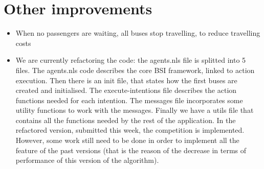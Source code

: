 \documentclass[a4paper]{article}
\begin{document}
\section{Other improvements}
\begin{itemize}
\item When no passengers are waiting, all buses stop travelling, to reduce travelling costs
\item We are currently refactoring the code: the agents.nls file is splitted into 5 files. The agents.nls code describes the core BSI framework, linked to action execution. Then there is an init file, that states how the first buses are created and initialised. The execute-intentions file describes the action functions needed for each intention. The messages file incorporates some utility functions to work with the messages. Finally we have a utils file that contains all the functions needed by the rest of the application. In the refactored version, submitted this week, the competition is implemented. However, some work still need to be done in order to implement all the feature of the past versions (that is the reason of the decrease in terms of performance of this version of the algorithm).  
\end{itemize}
\end{document}
